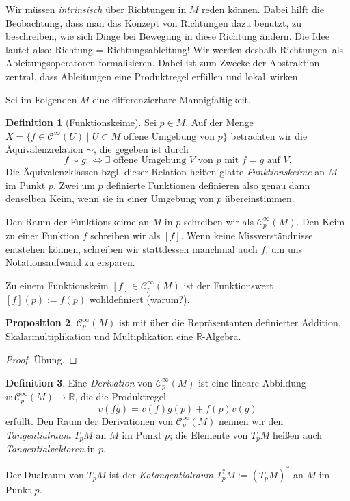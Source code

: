 \documentclass[a4paper]{scrbook}
\numberwithin{equation}{chapter}
\newcommand{\diff}{:\Longleftrightarrow}
\newcommand{\sC}{\mathcal{C}^{\infty}}
\theoremstyle{definition}
\newtheorem{defn}{Definition}[section]
\newtheorem{prop}[defn]{Proposition}
\newcommand{\bewUeb}{\begin{proof}Übung.\end{proof}}
\begin{document}
Wir müssen \emph{intrinsisch} über Richtungen in $M$ reden können. Dabei hilft die Beobachtung, dass man das Konzept von Richtungen dazu benutzt, zu beschreiben, wie sich Dinge bei Bewegung in diese Richtung ändern. Die Idee lautet also: Richtung = Richtungsableitung! Wir werden deshalb \glqq Richtungen\grqq\ als Ableitungsoperatoren formalisieren. Dabei ist zum Zwecke der Abstraktion zentral, dass Ableitungen eine Produktregel erfüllen und \glqq lokal\grqq\ wirken.

	Sei im Folgenden $M$ eine differenzierbare Mannigfaltigkeit.

\begin{defn}[Funktionskeime]
	Sei $p \in M$. Auf der Menge $X = \{f \in \sC(U) \mid U \subset M \text{ offene Umgebung von } p\}$ betrachten wir die Äquivalenzrelation $\sim$, die gegeben ist durch
	\[f \sim g \diff \exists \text{ offene Umgebung } V \text{ von } p \text{ mit } f = g \text{ auf } V.\]
	Die Äquivalenzklassen bzgl. dieser Relation heißen glatte \emph{Funktionskeime} an $M$ im Punkt $p$. Zwei um $p$ definierte Funktionen definieren also genau dann denselben Keim, wenn sie in einer Umgebung von $p$ übereinstimmen.

	Den Raum der Funktionskeime an $M$ in $p$ schreiben wir als $\sC_p(M)$. Den Keim zu einer Funktion $f$ schreiben wir als $[f]$. Wenn keine Missverständnisse entstehen können, schreiben wir stattdessen manchmal auch $f$, um uns Notationsaufwand zu ersparen.
\end{defn}

Zu einem Funktionskeim $[f] \in \sC_p(M)$ ist der Funktionswert $[f](p) := f(p)$ wohldefiniert (warum?).

\begin{prop}
	$\sC_p(M)$ ist mit über die Repräsentanten definierter Addition, Skalarmultiplikation und Multiplikation eine $\mathbb R$-Algebra. \bewUeb
\end{prop}

\begin{defn}
	Eine \emph{Derivation} von $\sC_p(M)$ ist eine lineare Abbildung $v\colon \sC_p(M) \to \mathbb R$, die die \glqq Produktregel\grqq\ \[v(fg) = v(f) g(p) + f(p) v(g)\] erfüllt. Den Raum der Derivationen von $\sC_p(M)$ nennen wir den \emph{Tangentialraum} $T_pM$ an $M$ im Punkt $p$; die Elemente von $T_pM$ heißen auch \emph{Tangentialvektoren} in $p$.

	Der Dualraum von $T_pM$ ist der \emph{Kotangentialraum} $T_p^*M := (T_pM)^*$ an $M$ im Punkt $p$.
\end{defn}
\end{document}

